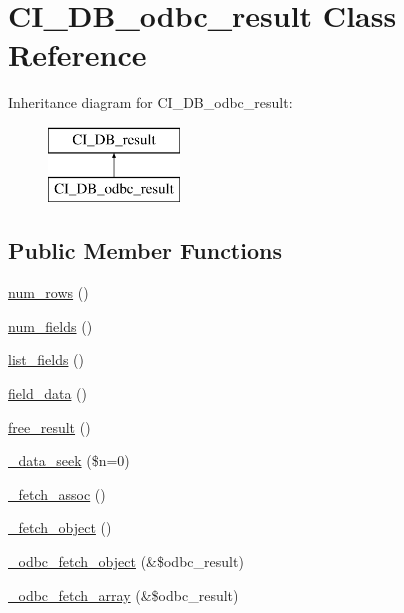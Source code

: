 \hypertarget{class_c_i___d_b__odbc__result}{\section{C\-I\-\_\-\-D\-B\-\_\-odbc\-\_\-result Class Reference}
\label{class_c_i___d_b__odbc__result}
}
Inheritance diagram for C\-I\-\_\-\-D\-B\-\_\-odbc\-\_\-result\-:\begin{figure}[H]
\begin{center}
\leavevmode
\includegraphics[height=2.000000cm]{class_c_i___d_b__odbc__result}
\end{center}
\end{figure}
\subsection*{Public Member Functions}
\begin{DoxyCompactItemize}
\item 
\hyperlink{class_c_i___d_b__odbc__result_a218657c303ee499b97710ab0cd2f5d6e}{num\-\_\-rows} ()
\item 
\hyperlink{class_c_i___d_b__odbc__result_af831bf363e4d7d661a717a4932af449d}{num\-\_\-fields} ()
\item 
\hyperlink{class_c_i___d_b__odbc__result_a50b54eb4ea7cfd039740f532988ea776}{list\-\_\-fields} ()
\item 
\hyperlink{class_c_i___d_b__odbc__result_a84bffd65e53902ade1591716749a33e3}{field\-\_\-data} ()
\item 
\hyperlink{class_c_i___d_b__odbc__result_aad2d98d6beb3d6095405356c6107b473}{free\-\_\-result} ()
\item 
\hyperlink{class_c_i___d_b__odbc__result_aeba9dd69307793342d1c81ccb3e55ff9}{\-\_\-data\-\_\-seek} (\$n=0)
\item 
\hyperlink{class_c_i___d_b__odbc__result_a43a9a92817f1334a1c10752ec44275a0}{\-\_\-fetch\-\_\-assoc} ()
\item 
\hyperlink{class_c_i___d_b__odbc__result_a236bae79bb43606aa86598719b281c1f}{\-\_\-fetch\-\_\-object} ()
\item 
\hyperlink{class_c_i___d_b__odbc__result_a70e24ec904e54f9ad271cc638b0edb12}{\-\_\-odbc\-\_\-fetch\-\_\-object} (\&\$odbc\-\_\-result)
\item 
\hyperlink{class_c_i___d_b__odbc__result_aef8e3fab992b363ed993c0c4492e7c3f}{\-\_\-odbc\-\_\-fetch\-\_\-array} (\&\$odbc\-\_\-result)
\end{DoxyCompactItemize}

